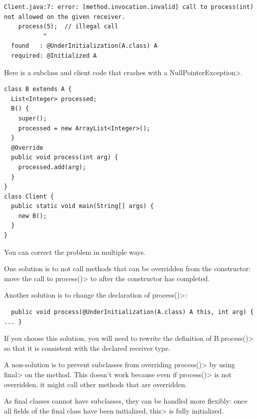 \begin{Verbatim}
Client.java:7: error: [method.invocation.invalid] call to process(int) not allowed on the given receiver.
    process(5);  // illegal call
           ^
  found   : @UnderInitialization(A.class) A
  required: @Initialized A
\end{Verbatim}

Here is a subclass and client code that crashes with a \<NullPointerException>.

\begin{Verbatim}
class B extends A {
  List<Integer> processed;
  B() {
    super();
    processed = new ArrayList<Integer>();
  }
  @Override
  public void process(int arg) {
    processed.add(arg);
  }
}
class Client {
  public static void main(String[] args) {
    new B();
  }
}
\end{Verbatim}

You can correct the problem in multiple ways.

One solution is to not call methods that can be overridden from the
constructor:  move the call to \<process()> to after the constructor has
completed.

Another solution is to change the declaration of \<process()>:

\begin{Verbatim}
  public void process(@UnderInitialization(A.class) A this, int arg) { ... }
\end{Verbatim}

If you choose this solution, you will need to rewrite the definition of
\<B.process()> so that it is consistent with the declared receiver type.

A non-solution is to prevent subclasses from overriding \<process()> by
using \<final> on the method.  This doesn't work because even if
\<process()> is not overridden, it might call other methods that are
overridden.

As final classes cannot have subclasses, they can be handled more
flexibly: once all fields of the final class have been
initialized, \<this> is fully initialized.





